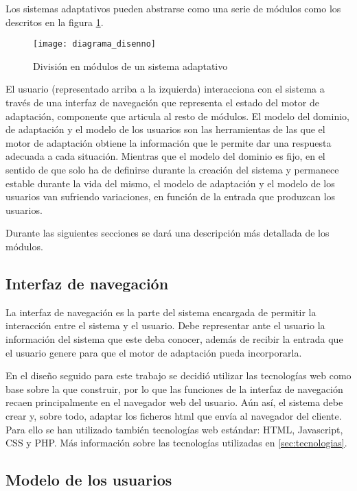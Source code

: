 Los sistemas adaptativos pueden abstrarse como una serie de módulos como los descritos en la figura \ref{fig:diagrama_disenno}. 

\begin{figure}[htp!]
	\centering
	\texttt{[image: diagrama\_disenno]}
	\caption{División en módulos de un sistema adaptativo}
	\label{fig:diagrama_disenno}
\end{figure}

El usuario (representado arriba a la izquierda) interacciona con el sistema a través de una interfaz de navegación que representa el estado del motor de adaptación, componente que articula al resto de módulos. El modelo del dominio, de adaptación y el modelo de los usuarios son las herramientas de las que el motor de adaptación obtiene la información que le permite dar una respuesta adecuada a cada situación. Mientras que el modelo del dominio es fijo, en el sentido de que solo ha de definirse durante la creación del sistema y permanece estable durante la vida del mismo, el modelo de adaptación y el modelo de los usuarios van sufriendo variaciones, en función de la entrada que produzcan los usuarios.

Durante las siguientes secciones se dará una descripción más detallada de los módulos.

\subsection{Interfaz de navegación}

La interfaz de navegación es la parte del sistema encargada de permitir la interacción entre el sistema y el usuario. Debe representar ante el usuario la información del sistema que este deba conocer, además de recibir la entrada que el usuario genere para que el motor de adaptación pueda incorporarla.

En el diseño seguido para este trabajo se decidió utilizar las tecnologías web como base sobre la que construir, por lo que las funciones de la interfaz de navegación recaen principalmente en el navegador web del usuario. Aún así, el sistema debe crear y, sobre todo, adaptar los ficheros html que envía al navegador del cliente. Para ello se han utilizado también tecnologías web estándar: HTML, Javascript, CSS y PHP. Más información sobre las tecnologías utilizadas en \ref{sec:tecnologias}.

\subsection{Modelo de los usuarios}

